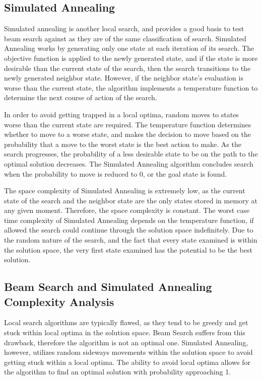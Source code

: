 \documentclass[10pt, twocolumn]{article}
\begin{document}
\subsection{Simulated Annealing}
Simulated annealing is another local search, and provides a good basis to test beam search against as they are of the same classification of search. Simulated Annealing works by generating only one state at each iteration of its search. The objective function is applied to the newly generated state, and if the state is more desirable than the current state of the search, then the search transitions to the newly generated neighbor state. However, if the neighbor state's evaluation is worse than the current state, the algorithm implements a temperature function to determine the next course of action of the search.

In order to avoid getting trapped in a local optima, random moves to states worse than the current state are required. The temperature function determines whether to move to a worse state, and makes the decision to move based on the probability that a move to the worst state is the best action to make. As the search progresses, the probability of a less desirable state to be on the path to the optimal solution decreases. The Simulated Annealing algorithm concludes search when the probability to move is reduced to 0, or the goal state is found.

The space complexity of Simulated Annealing is extremely low, as the current state of the search and the neighbor state are the only states stored in memory at any given moment. Therefore, the space complexity is constant. The worst case time complexity of Simulated Annealing depends on the temperature function, if allowed the search could continue through the solution space indefinitely. Due to the random nature of the search, and the fact that every state examined is within the solution space, the very first state examined has the potential to be the best solution.

\subsection{Beam Search and Simulated Annealing Complexity Analysis}
Local search algorithms are typically flawed, as they tend to be greedy and get stuck within local optima in the solution space. Beam Search suffers from this drawback, therefore the algorithm is not an optimal one. Simulated Annealing, however, utilizes random sideways movements within the solution space to avoid getting stuck within a local optima. The ability to avoid local optima allows for the algorithm to find an optimal solution with probability approaching 1.
\end{document}
